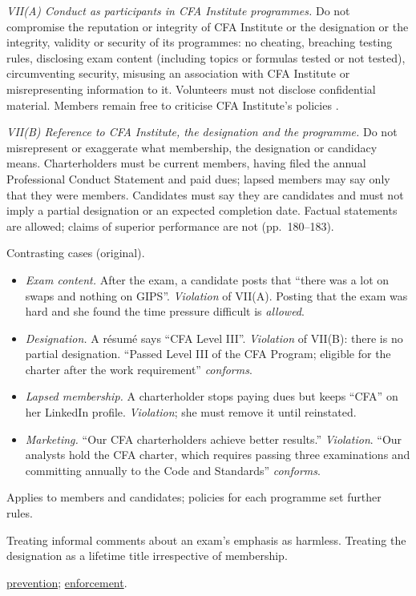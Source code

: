 \begin{qfrule}\label{rule:standard-member-responsibilities}
 \emph{VII(A) Conduct as participants in CFA Institute programmes.} Do not compromise the reputation or integrity of CFA Institute or the designation or the integrity, validity or security of its programmes: no cheating, breaching testing rules, disclosing exam content (including topics or formulas tested or not tested), circumventing security, misusing an association with CFA Institute or misrepresenting information to it. Volunteers must not disclose confidential material. Members remain free to criticise CFA Institute's policies \citep[pp.~173--175]{standards-practice-handbook-2024}.

\emph{VII(B) Reference to CFA Institute, the designation and the programme.} Do not misrepresent or exaggerate what membership, the designation or candidacy means. Charterholders must be current members, having filed the annual Professional Conduct Statement and paid dues; lapsed members may say only that they were members. Candidates must say they are candidates and must not imply a partial designation or an expected completion date. Factual statements are allowed; claims of superior performance are not (pp.~180--183).

 Contrasting cases (original).
\begin{itemize}
\item \emph{Exam content.} After the exam, a candidate posts that ``there was a lot on swaps and nothing on GIPS''. \emph{Violation} of VII(A). Posting that the exam was hard and she found the time pressure difficult is \emph{allowed}.
\item \emph{Designation.} A résumé says ``CFA Level III''. \emph{Violation} of VII(B): there is no partial designation. ``Passed Level III of the CFA Program; eligible for the charter after the work requirement'' \emph{conforms}.
\item \emph{Lapsed membership.} A charterholder stops paying dues but keeps ``CFA'' on her LinkedIn profile. \emph{Violation}; she must remove it until reinstated.
\item \emph{Marketing.} ``Our CFA charterholders achieve better results.'' \emph{Violation}. ``Our analysts hold the CFA charter, which requires passing three examinations and committing annually to the Code and Standards'' \emph{conforms}.
\end{itemize}

 Applies to members and candidates; policies for each programme set further rules.

 Treating informal comments about an exam's emphasis as harmless. Treating the designation as a lifetime title irrespective of membership.

 \hyperref[meth:preventing-member-violations]{prevention}; \hyperref[def:professional-conduct-programme]{enforcement}.

\end{qfrule}

